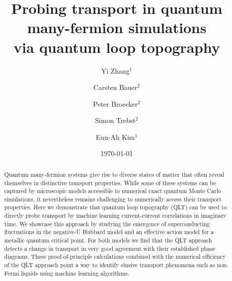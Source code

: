 \documentclass[amsmath,amssymb, aps, prl, twocolumn]{revtex4-1}
\begin{document}
\title{ Probing transport in quantum many-fermion simulations\\ via quantum loop topography}

\author{Yi Zhang$^1$}
\author{Carsten Bauer$^2$}
\author{Peter Broecker$^2$} 
\author{Simon Trebst$^2$}
\author{Eun-Ah Kim$^1$}

%

\date{\today}%

\begin{abstract}
Quantum many-fermion systems give rise to diverse states of matter that often reveal themselves in distinctive transport properties. While some of these systems can be captured by microscopic models accessible to numerical exact quantum Monte Carlo simulations, it nevertheless remains challenging to  numerically access their transport properties. 
Here we demonstrate that quantum loop topography (QLT) can be used to directly probe transport by machine learning current-current correlations in imaginary time.
We showcase this approach by studying the emergence of superconducting fluctuations in the negative-U Hubbard model and  
an effective action model for a metallic %
quantum critical point. 
For both models we find that the QLT approach detects a change in transport in very good agreement with their established 
phase diagrams.
These proof-of-principle calculations combined with the numerical efficiency of the QLT approach point a way to identify elusive
transport phenomena such as non-Fermi liquids using machine learning algorithms.

\end{abstract}
\end{document}
